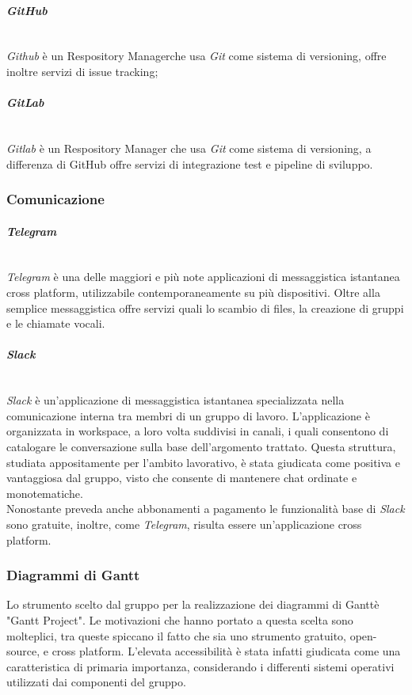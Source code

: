 \paragraph{\textit{GitHub}} ~\\
	\textit{Github} è un Respository Manager\glossario che usa \textit{Git} come sistema di versioning, offre inoltre 	servizi di issue tracking\glossario;
	
\paragraph{\textit{GitLab}} \-\\
	\textit{Gitlab} è un Respository Manager che usa \textit{Git} come sistema di versioning, a differenza di GitHub offre servizi di integrazione test e pipeline di sviluppo. 

\subsubsection{Comunicazione}

\paragraph{\textit{Telegram}} ~\\
	\textit{Telegram} è una delle maggiori e più note applicazioni di messaggistica istantanea cross platform, 					utilizzabile contemporaneamente su più dispositivi. Oltre alla semplice messaggistica offre servizi quali lo 				scambio di files, la creazione di gruppi e le chiamate vocali.

\paragraph{\textit{Slack}} ~\\
	\textit{Slack} è un'applicazione di messaggistica istantanea specializzata nella comunicazione interna tra membri di un gruppo di lavoro. L'applicazione è organizzata in workspace, a loro volta suddivisi in canali, i quali 			consentono di catalogare le conversazione sulla base dell'argomento trattato. Questa struttura, studiata 						appositamente per l'ambito lavorativo, è stata giudicata come positiva e vantaggiosa dal gruppo, visto che 					consente di mantenere chat ordinate e monotematiche.\\
	Nonostante preveda anche abbonamenti a pagamento le funzionalità base di \textit{Slack} sono gratuite, inoltre, come \textit{Telegram}, risulta essere un'applicazione cross platform\glossario.

\subsubsection{Diagrammi di Gantt}
	Lo strumento scelto dal gruppo per la realizzazione dei diagrammi di Gantt\glossario è "Gantt Project". Le 					motivazioni che hanno portato a questa scelta sono molteplici, tra queste spiccano il fatto che sia uno strumento 	gratuito, open-source\glossario, e cross platform. L'elevata accessibilità è stata infatti 				giudicata come una caratteristica di primaria importanza, considerando i differenti sistemi operativi utilizzati 		dai componenti del gruppo.

